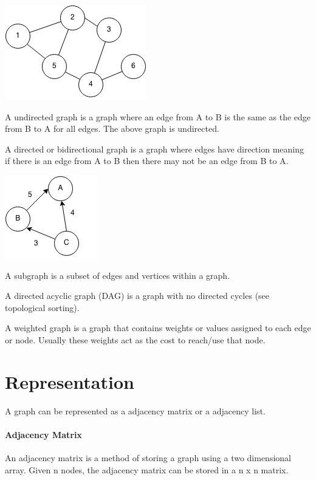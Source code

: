 \documentclass[11pt,oneside]{book}
\makeatletter
\def\maxwidth#1{\ifdim\Gin@nat@width>#1 #1\else\Gin@nat@width\fi}
\makeatother
\begin{document}
\vspace{5px}\includegraphics[width=\maxwidth{\textwidth}]{graph.png}

A undirected graph is a graph where an edge from A to B is the same as the edge from B to A for all edges. The above graph is undirected.

A directed or bidirectional graph is a graph where edges have direction meaning if there is an edge from A to B then there may not be an edge from B to A.

\vspace{5px}\includegraphics[width=\maxwidth{\textwidth}]{digraph.png}

A subgraph is a subset of edges and vertices within a graph.

A directed acyclic graph (DAG) is a graph with no directed cycles (see topological sorting).

A weighted graph is a graph that contains weights or values assigned to each edge or node. Usually these weights act as the cost to reach/use that node.


    \chapter{ Representation }
        

A graph can be represented as a adjacency matrix or a adjacency list.

\subsubsection{Adjacency Matrix}



An adjacency matrix is a method of storing a graph using a two dimensional array. Given n nodes, the adjacency matrix can be stored in a n x n matrix.
\end{document}
